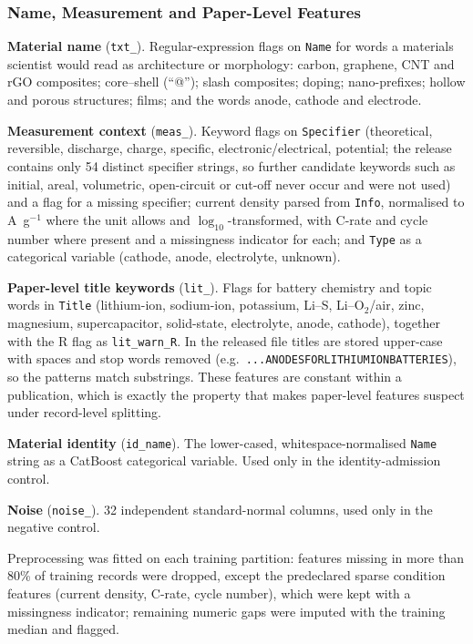 \documentclass[journal=jcisd8,manuscript=article,layout=traditional]{achemso}
\begin{document}
\subsubsection{Name, Measurement and Paper-Level Features}

\textbf{Material name} (\texttt{txt\_}). Regular-expression flags on \texttt{Name} for words a materials scientist would read as architecture or morphology: carbon, graphene, CNT and rGO composites; core--shell (``@''); slash composites; doping; nano-prefixes; hollow and porous structures; films; and the words anode, cathode and electrode.

\textbf{Measurement context} (\texttt{meas\_}). Keyword flags on \texttt{Specifier} (theoretical, reversible, discharge, charge, specific, electronic/electrical, potential; the release contains only 54 distinct specifier strings, so further candidate keywords such as initial, areal, volumetric, open-circuit or cut-off never occur and were not used) and a flag for a missing specifier; current density parsed from \texttt{Info}, normalised to A~g$^{-1}$ where the unit allows and $\log_{10}$-transformed, with C-rate and cycle number where present and a missingness indicator for each; and \texttt{Type} as a categorical variable (cathode, anode, electrolyte, unknown).

\textbf{Paper-level title keywords} (\texttt{lit\_}). Flags for battery chemistry and topic words in \texttt{Title} (lithium-ion, sodium-ion, potassium, Li--S, Li--O$_2$/air, zinc, magnesium, supercapacitor, solid-state, electrolyte, anode, cathode), together with the R flag as \texttt{lit\_warn\_R}. In the released file titles are stored upper-case with spaces and stop words removed (e.g.\ \texttt{...ANODESFORLITHIUMIONBATTERIES}), so the patterns match substrings. These features are constant within a publication, which is exactly the property that makes paper-level features suspect under record-level splitting.

\textbf{Material identity} (\texttt{id\_name}). The lower-cased, whitespace-normalised \texttt{Name} string as a CatBoost categorical variable. Used only in the identity-admission control.

\textbf{Noise} (\texttt{noise\_}). 32 independent standard-normal columns, used only in the negative control.

Preprocessing was fitted on each training partition: features missing in more than 80\% of training records were dropped, except the predeclared sparse condition features (current density, C-rate, cycle number), which were kept with a missingness indicator; remaining numeric gaps were imputed with the training median and flagged.
\end{document}
